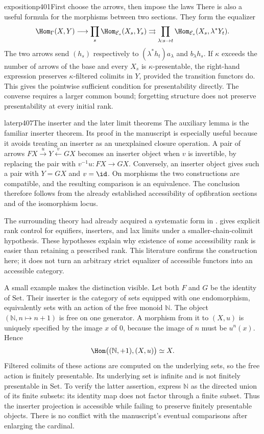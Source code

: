 \begin{dcomment}{exposition}{p401}{First choose the arrows, then impose the laws}
There is also a useful formula for the morphisms between two sections. They form the equalizer
\[
 \Hom_{\Gamma}(X,Y)\longrightarrow
 \prod_s\Hom_{\mathcal E_s}(X_s,Y_s)
 \rightrightarrows
 \prod_{\lambda:s\to t}
 \Hom_{\mathcal E_s}(X_s,\lambda^*Y_t).
\]
The two arrows send $(h_s)$ respectively to $(\lambda^*h_t)a_\lambda$ and $b_\lambda h_s$. If $\kappa$ exceeds the number of arrows of the base and every $X_s$ is $\kappa$-presentable, the right-hand expression preserves $\kappa$-filtered colimits in $Y$, provided the transition functors do. This gives the pointwise sufficient condition for presentability directly. The converse requires a larger common bound; forgetting structure does not preserve presentability at every initial rank.
\end{dcomment}

\begin{dcomment}{later}{p407}{The inserter and the later limit theorems}
The auxiliary lemma is the familiar inserter theorem. Its proof in the manuscript is especially useful because it avoids treating an inserter as an unexplained closure operation. A pair of arrows $FX\xrightarrow{u}Y\xleftarrow{v}GX$ becomes an inserter object when $v$ is invertible, by replacing the pair with $v^{-1}u:FX\to GX$. Conversely, an inserter object gives such a pair with $Y=GX$ and $v=\id$. On morphisms the two constructions are compatible, and the resulting comparison is an equivalence. The conclusion therefore follows from the already established accessibility of opfibration sections and of the isomorphism locus.

The surrounding theory had already acquired a systematic form in \citet[\S5.1]{MakkaiPare1989}. \citet[Theorems 3.1, 4.1, and 8.1--8.3]{Positselski2024Limits} gives explicit rank control for equifiers, inserters, and lax limits under a smaller-chain-colimit hypothesis. These hypotheses explain why existence of some accessibility rank is easier than retaining a prescribed rank. This literature confirms the construction here; it does not turn an arbitrary strict equalizer of accessible functors into an accessible category.

A small example makes the distinction visible. Let both $F$ and $G$ be the identity of $\mathrm{Set}$. Their inserter is the category of sets equipped with one endomorphism, equivalently sets with an action of the free monoid $\mathbb N$. The object $(\mathbb N,n\mapsto n+1)$ is free on one generator. A morphism from it to $(X,u)$ is uniquely specified by the image $x$ of $0$, because the image of $n$ must be $u^n(x)$. Hence
\[
 \Hom\bigl((\mathbb N,+1),(X,u)\bigr)\simeq X.
\]
Filtered colimits of these actions are computed on the underlying sets, so the free action is finitely presentable. Its underlying set is infinite and is not finitely presentable in $\mathrm{Set}$. To verify the latter assertion, express $\mathbb N$ as the directed union of its finite subsets: its identity map does not factor through a finite subset. Thus the inserter projection is accessible while failing to preserve finitely presentable objects. There is no conflict with the manuscript's eventual comparisons after enlarging the cardinal.


\end{dcomment}
